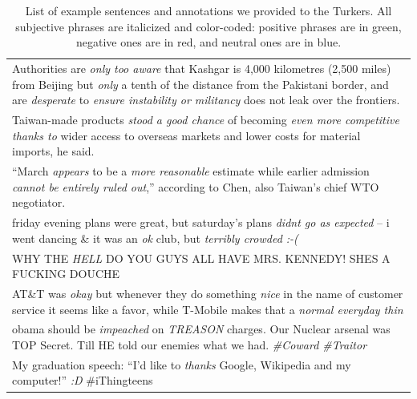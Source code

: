 \documentclass[11pt]{article}
\begin{document}
\begin{table}[t]
 \centering
\small
\begin{tabular}{|p{16cm}|}
\hline
 Authorities are \textit{\color{red}only too aware} that Kashgar is 4,000 kilometres (2,500 miles) from Beijing but \textit{\color{green}only} a tenth of the distance from the  Pakistani border, and are \textit{\color{red}desperate} to \textit{\color{red} ensure instability or militancy} does not leak over the frontiers. \\[3pt]
Taiwan-made products \textit{\color{green} stood a good chance} of becoming \textit{\color{green} even more competitive thanks to} wider access to overseas markets and lower costs for material imports, he said. \\[3pt]
``March \textit{\color{blue}appears} to be a \textit{\color{blue}more reasonable} estimate while earlier admission \textit{\color{blue}cannot be entirely ruled out},'' according to Chen, also Taiwan's chief WTO negotiator. \\[3pt]
friday evening plans were great, but saturday's plans \textit{\color{red}didnt go as expected} -- i went dancing \& it was an \textit{\color{blue}ok} club, but \textit{\color{red}terribly crowded :-(} \\[3pt]
WHY THE \textit{\color{red}HELL} DO YOU GUYS ALL HAVE MRS. KENNEDY! SHES A FUCKING DOUCHE \\[3pt]
AT\&T was \textit{\color{blue}okay} but whenever they do something \textit{\color{green}nice} in the name of customer service it seems like a favor, while T-Mobile makes that a \textit{\color{green}normal everyday thin} \\[3pt]
obama should be \textit{\color{red}impeached} on \textit{\color{red}TREASON} charges. Our Nuclear arsenal was TOP Secret. Till HE told our enemies what we had. \textit{\color{red}\#Coward \#Traitor} \\[3pt]
My graduation speech: ``I'd like to \textit{\color{green}thanks} Google, Wikipedia and my computer!'' \textit{\color{green}:D} \#iThingteens \\
\hline
\end{tabular}
\caption{List of example sentences and annotations we provided to the Turkers. All subjective phrases are italicized and color-coded: positive phrases are in green, negative ones are in red, and neutral ones are in blue.}
\label{T:annotation-examples}
\end{table}
\end{document}
